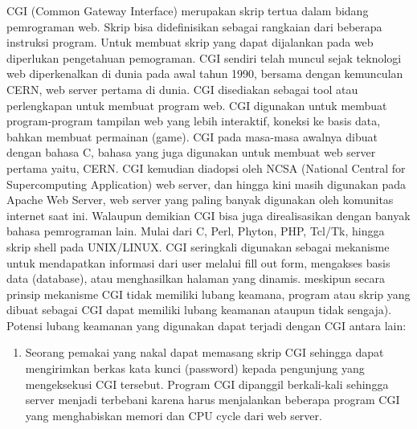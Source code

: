 	CGI (Common Gateway Interface) merupakan skrip tertua dalam bidang pemrograman web. Skrip bisa didefinisikan sebagai rangkaian dari beberapa instruksi program. Untuk membuat skrip yang dapat dijalankan pada web diperlukan pengetahuan pemograman. 
	CGI sendiri telah muncul sejak teknologi web diperkenalkan di dunia pada awal tahun 1990, bersama dengan kemunculan CERN, web server pertama di dunia. CGI disediakan sebagai tool atau perlengkapan untuk membuat program web. CGI digunakan untuk membuat program-program tampilan web yang lebih interaktif, koneksi ke basis data, bahkan membuat permainan (game). 
	CGI pada masa-masa awalnya dibuat dengan bahasa C, bahasa yang juga digunakan untuk membuat web server pertama yaitu, CERN. CGI kemudian diadopsi oleh NCSA (National Central for Supercomputing Application) web server, dan hingga kini masih digunakan pada Apache Web Server, web server yang paling banyak digunakan oleh komunitas internet saat ini.
	Walaupun demikian CGI bisa juga direalisasikan dengan banyak bahasa pemrograman lain. Mulai dari C, Perl, Phyton, PHP, Tcl/Tk, hingga skrip shell pada UNIX/LINUX. 
	CGI seringkali digunakan sebagai mekanisme untuk mendapatkan informasi dari user melalui fill out form, mengakses basis data (database), atau menghasilkan halaman yang dinamis. meskipun secara prinsip mekanisme CGI tidak memiliki lubang keamana, program atau skrip yang dibuat sebagai CGI dapat memiliki lubang keamanan ataupun tidak sengaja). Potensi lubang keamanan yang digunakan dapat terjadi dengan CGI antara lain: 
\begin{enumerate}
\item Seorang pemakai yang nakal dapat memasang skrip CGI sehingga dapat mengirimkan berkas kata kunci (password) kepada pengunjung yang mengeksekusi CGI tersebut. 
\tem Program CGI dipanggil berkali-kali sehingga server menjadi terbebani karena harus menjalankan beberapa program CGI yang menghabiskan memori dan CPU cycle dari web server.
	\end{enumerate}
